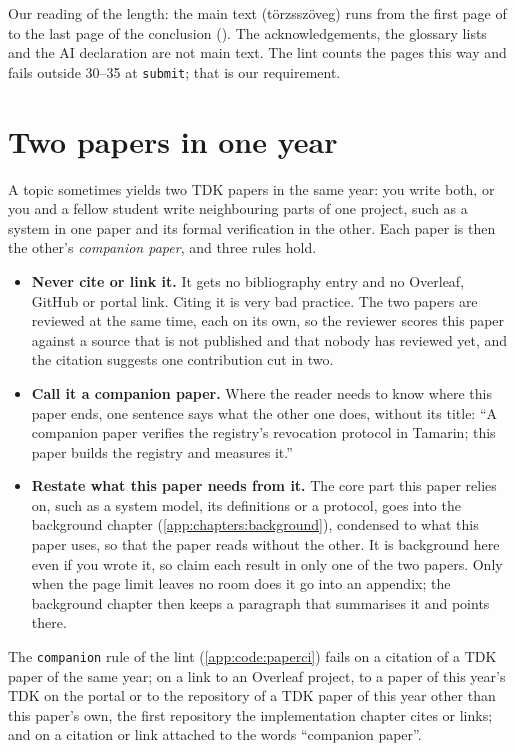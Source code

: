 Our reading of the length: the main text (törzsszöveg) runs from the first page of  to the last page of the conclusion (). The acknowledgements, the glossary lists and the AI declaration are not main text. The lint counts the pages this way and fails outside 30--35 at \texttt{submit}; that is our requirement.

\section{Two papers in one year}\label{app:tdk:companion}
A topic sometimes yields two TDK papers in the same year: you write both, or you and a fellow student write neighbouring parts of one project, such as a system in one paper and its formal verification in the other. Each paper is then the other's \emph{companion paper}, and three rules hold.
\begin{itemize}
  \item \textbf{Never cite or link it.} It gets no bibliography entry and no Overleaf, GitHub or portal link. Citing it is very bad practice. The two papers are reviewed at the same time, each on its own, so the reviewer scores this paper against a source that is not published and that nobody has reviewed yet, and the citation suggests one contribution cut in two.
  \item \textbf{Call it a companion paper.} Where the reader needs to know where this paper ends, one sentence says what the other one does, without its title: \enquote{A companion paper verifies the registry's revocation protocol in Tamarin; this paper builds the registry and measures it.}
  \item \textbf{Restate what this paper needs from it.} The core part this paper relies on, such as a system model, its definitions or a protocol, goes into the background chapter (\cref{app:chapters:background}), condensed to what this paper uses, so that the paper reads without the other. It is background here even if you wrote it, so claim each result in only one of the two papers. Only when the page limit leaves no room does it go into an appendix; the background chapter then keeps a paragraph that summarises it and points there.
\end{itemize}
The \texttt{companion} rule of the lint (\cref{app:code:paperci}) fails on a citation of a TDK paper of the same year; on a link to an Overleaf project, to a paper of this year's TDK on the portal or to the repository of a TDK paper of this year other than this paper's own, the first repository the implementation chapter cites or links; and on a citation or link attached to the words \enquote{companion paper}.

